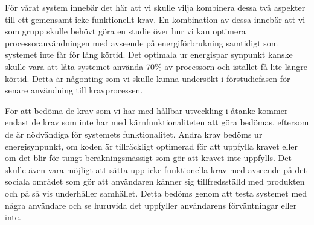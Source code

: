 För vårat system innebär det här att vi skulle vilja kombinera dessa två aspekter till ett gemensamt icke funktionellt krav. En kombination av dessa innebär att vi som grupp skulle behövt göra en studie över hur vi kan optimera processoranvändningen med avseende på energiförbrukning samtidigt som systemet inte får för lång körtid. Det optimala ur energispar synpunkt kanske skulle vara att låta systemet använda 70\% av processorn och istället få lite längre körtid. Detta är någonting som vi skulle kunna undersökt i förstudiefasen för senare användning till kravprocessen.

För att bedöma de krav som vi har med hållbar utveckling i åtanke kommer endast de krav som inte har med kärnfunktionaliteten att göra bedömas, eftersom de är nödvändiga för systemets funktionalitet. Andra krav bedöms ur energisynpunkt, om koden är tillräckligt optimerad för att uppfylla kravet eller om det blir för tungt beräkningsmässigt som gör att kravet inte uppfylls. Det skulle även vara möjligt att sätta upp icke funktionella krav med avseende på det sociala området som gör att användaren känner sig tillfredsställd med produkten och på så vis underhåller samhället. Detta bedöms genom att testa systemet med några användare och se huruvida det uppfyller användarens förväntningar eller inte. 


